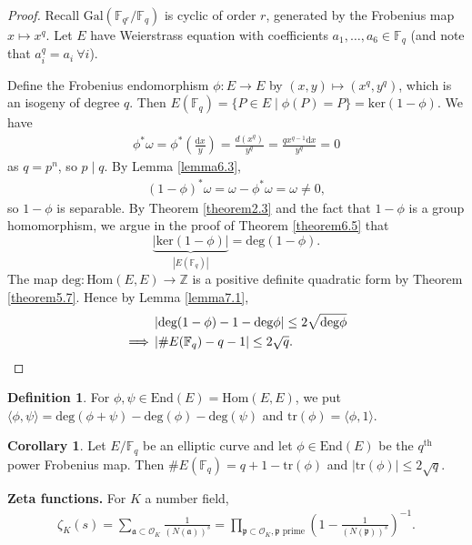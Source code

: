 \documentclass{article}
\theoremstyle{definition}
\newtheorem{cor}[theorem]{Corollary}
\newtheorem{defn}{Definition}[section]
\begin{document}
\begin{proof}
    Recall $\text{Gal}(\mathbb{F}_{q^r}/\mathbb{F}_q)$ is cyclic of order $r$, generated by the Frobenius map $x \mapsto x^q$. Let $E$ have Weierstrass equation with coefficients $a_1,\ldots,a_6 \in \mathbb{F}_q$ (and note that $a_i^q = a_i ~\forall i$). 
    \vspace{1mm}
     
    Define the Frobenius endomorphism $\phi: E \to E$ by $(x,y) \mapsto (x^q,y^q)$, which is an isogeny of degree $q$. Then $E(\mathbb{F}_q) = \{P \in E \mid \phi(P) = P\} = \text{ker}(1-\phi)$. We have
    \begin{align*}
        \phi^* \omega = \phi^* \left(\frac{\mathrm{d}x}{y}\right) = \frac{d(x^q)}{y^q} = \frac{qx^{q-1}\mathrm{d}x}{y^q} = 0
    \end{align*}
    as $q=p^n$, so $p \mid q$. By Lemma \ref{lemma6.3},
    \begin{align*}
        (1-\phi)^* \omega = \omega - \phi^* \omega = \omega \neq 0,
    \end{align*}
    so $1-\phi$ is separable. By Theorem \ref{theorem2.3} and the fact that $1-\phi$ is a group homomorphism, we argue in the proof of Theorem \ref{theorem6.5} that $$\underbrace{\left|\text{ker}(1-\phi)\right|}_{\left|E(\mathbb{F}_q)\right|} = \text{deg}(1-\phi).$$
    The map $\text{deg}: \text{Hom}(E,E) \to \mathbb{Z}$ is a positive definite quadratic form by Theorem \ref{theorem5.7}. Hence by Lemma \ref{lemma7.1}, 
    \begin{align*}
        &\left|\text{deg}(1-\phi) - 1 - \text{deg}\phi\right|\le 2\sqrt{\text{deg}\phi}\\
        \implies&\left|\# E(\mathbb{F}_q)-q-1\right| \le 2\sqrt{q}.
        \qedhere
    \end{align*}
\end{proof}
\begin{defn}
    For $\phi, \psi \in \text{End}(E) = \text{Hom}(E,E)$, we put $\langle \phi, \psi \rangle = \text{deg}(\phi+\psi)-\text{deg}(\phi)-\text{deg}(\psi)$ and $\text{tr}(\phi) = \langle \phi,1 \rangle$.
\end{defn}
\begin{cor}
    Let $E/\mathbb{F}_q$ be an elliptic curve and let $\phi \in \text{End}(E)$ be the $q^{\text{th}}$ power Frobenius map. Then $\# E(\mathbb{F}_q) = q+1 - \text{tr}(\phi)$ and $\left|\text{tr}(\phi)\right|\le 2\sqrt{q}$.
\end{cor}
\textbf{Zeta functions.} For $K$ a number field, 
\begin{align*}
    \zeta_K(s) = \sum_{\mathfrak{a} \subset \mathcal{O}_K}^{} \frac{1}{(N(\mathfrak{a}))^s} = \prod_{\mathfrak{p} \subset \mathcal{O}_K, \mathfrak{p} \text{ prime}}^{} \left(1-\frac{1}{(N(\mathfrak{p}))^s}\right)^{-1}.
\end{align*} 
\end{document}
